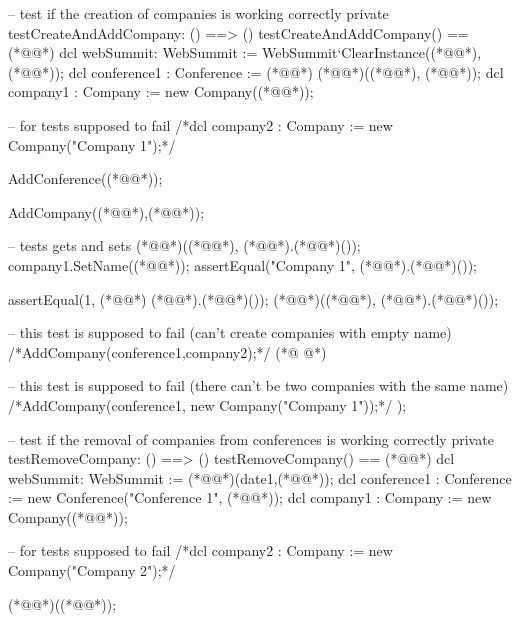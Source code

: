 \begin{vdmpp}[breaklines=true]
  -- test if the creation of companies is working correctly
 private testCreateAndAddCompany: () ==> ()
 testCreateAndAddCompany() == (*@\vdmnotcovered{(}@*)
  dcl webSummit: WebSummit := WebSummit`ClearInstance((*@@*),(*@@*));
  dcl conference1 : Conference := (*@@*) (*@@*)((*@@*), (*@@*));
  dcl company1 : Company := new Company((*@@*));
  
  -- for tests supposed to fail
  /*dcl company2 : Company := new Company("Company 1");*/
  
  AddConference((*@@*));
  
  AddCompany((*@@*),(*@@*));
  
  -- tests gets and sets
  (*@@*)((*@@*), (*@@*).(*@@*)());
  company1.SetName((*@@*));
  assertEqual("Company 1", (*@@*).(*@@*)());
  
  assertEqual(1, (*@@*) (*@@*).(*@@*)());
  (*@@*)({(*@@*)}, (*@@*).(*@@*)());
  
  -- this test is supposed to fail (can't create companies with empty name)
  /*AddCompany(conference1,company2);*/
(*@
\label{testRemoveCompany:272}
@*)
  
  -- this test is supposed to fail (there can't be two companies with the same name)
  /*AddCompany(conference1, new Company("Company 1"));*/
 );
 
 -- test if the removal of companies from conferences is working correctly
 private testRemoveCompany: () ==> ()
 testRemoveCompany() == (*@\vdmnotcovered{(}@*)
  dcl webSummit: WebSummit := (*@@*)(date1,(*@@*));
  dcl conference1 : Conference := new Conference("Conference 1", (*@@*));
  dcl company1 : Company := new Company((*@@*));
  
  -- for tests supposed to fail
  /*dcl company2 : Company := new Company("Company 2");*/
  
  (*@@*)((*@@*));


\end{vdmpp}
